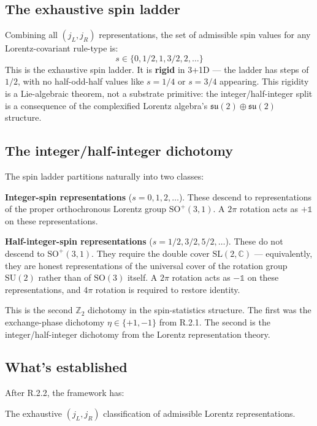 \documentclass[11pt,a4paper]{article}
\begin{document}
\subsection{The exhaustive spin ladder}

Combining all $(j_L, j_R)$ representations, the set of admissible spin values for any Lorentz-covariant rule-type is:
\[
s \in \{0, 1/2, 1, 3/2, 2, \ldots\}
\]
This is the exhaustive spin ladder. It is \textbf{rigid} in 3+1D --- the ladder has steps of $1/2$, with no half-odd-half values like $s = 1/4$ or $s = 3/4$ appearing. This rigidity is a Lie-algebraic theorem, not a substrate primitive: the integer/half-integer split is a consequence of the complexified Lorentz algebra's $\mathfrak{su}(2) \oplus \mathfrak{su}(2)$ structure.

\subsection{The integer/half-integer dichotomy}

The spin ladder partitions naturally into two classes:

\textbf{Integer-spin representations} ($s = 0, 1, 2, \ldots$). These descend to representations of the proper orthochronous Lorentz group $\mathrm{SO}^+(3,1)$. A $2\pi$ rotation acts as $+\mathbb{1}$ on these representations.

\textbf{Half-integer-spin representations} ($s = 1/2, 3/2, 5/2, \ldots$). These do not descend to $\mathrm{SO}^+(3,1)$. They require the double cover $\mathrm{SL}(2,\mathbb{C})$ --- equivalently, they are honest representations of the universal cover of the rotation group $\mathrm{SU}(2)$ rather than of $\mathrm{SO}(3)$ itself. A $2\pi$ rotation acts as $-\mathbb{1}$ on these representations, and $4\pi$ rotation is required to restore identity.

This is the second $\mathbb{Z}_2$ dichotomy in the spin-statistics structure. The first was the exchange-phase dichotomy $\eta \in \{+1, -1\}$ from R.2.1. The second is the integer/half-integer dichotomy from the Lorentz representation theory.

\subsection{What's established}

After R.2.2, the framework has:

The exhaustive $(j_L, j_R)$ classification of admissible Lorentz representations.
\end{document}
